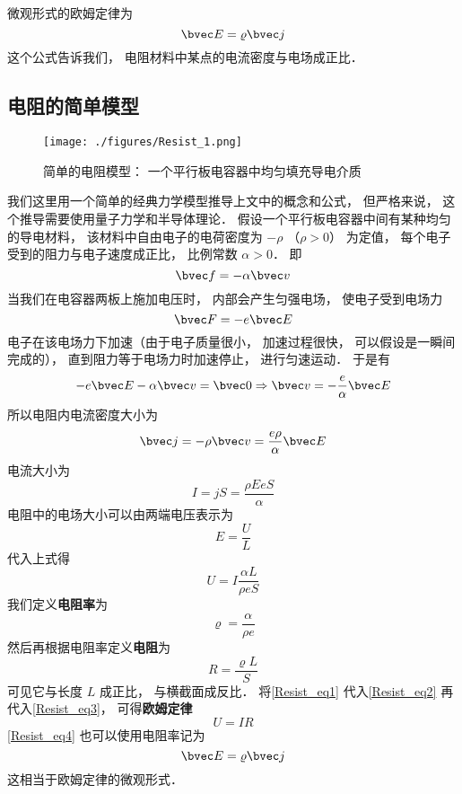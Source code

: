 微观形式的欧姆定律为
\begin{equation}
\bvec E = \varrho\bvec j
\end{equation}
这个公式告诉我们， 电阻材料中某点的电流密度与电场成正比．

\subsection{电阻的简单模型}
\begin{figure}[ht]
\centering
\texttt{[image: ./figures/Resist\_1.png]}
\caption{简单的电阻模型： 一个平行板电容器中均匀填充导电介质} \label{Resist_fig1}
\end{figure}

我们这里用一个简单的经典力学模型推导上文中的概念和公式， 但严格来说， 这个推导需要使用量子力学和半导体理论． 假设一个平行板电容器中间有某种均匀的导电材料， 该材料中自由电子的电荷密度为 $-\rho$ （$\rho > 0$） 为定值， 每个电子受到的阻力与电子速度成正比， 比例常数 $\alpha > 0$． 即
\begin{equation}
\bvec f = -\alpha \bvec v
\end{equation}
当我们在电容器两板上施加电压时， 内部会产生匀强电场， 使电子受到电场力
\begin{equation}
\bvec F = -e\bvec E
\end{equation}
电子在该电场力下加速（由于电子质量很小， 加速过程很快， 可以假设是一瞬间完成的）， 直到阻力等于电场力时加速停止， 进行匀速运动． 于是有
\begin{equation}
-e\bvec E - \alpha \bvec v = \bvec 0 \Rightarrow \bvec v = -\frac{e}{\alpha}\bvec E
\end{equation}
所以电阻内电流密度大小为
\begin{equation}\label{Resist_eq4}
\bvec j = -\rho \bvec v = \frac{e\rho}{\alpha}\bvec E
\end{equation}
电流大小为
\begin{equation}
I = jS = \frac{\rho EeS}{\alpha}
\end{equation}
电阻中的电场大小可以由两端电压表示为
\begin{equation}
E = \frac UL
\end{equation}
代入上式得
\begin{equation}\label{Resist_eq3}
U = I \frac{\alpha L}{\rho eS}
\end{equation}
我们定义\textbf{电阻率}为
\begin{equation}\label{Resist_eq1}
\varrho = \frac{\alpha}{\rho e}
\end{equation}
然后再根据电阻率定义\textbf{电阻}为
\begin{equation}\label{Resist_eq2}
R = \frac{\varrho L}{S}
\end{equation}
可见它与长度 $L$ 成正比， 与横截面成反比． 将\autoref{Resist_eq1} 代入\autoref{Resist_eq2} 再代入\autoref{Resist_eq3}， 可得\textbf{欧姆定律}
\begin{equation}
U = IR
\end{equation}
\autoref{Resist_eq4} 也可以使用电阻率记为
\begin{equation}
\bvec E = \varrho\bvec j
\end{equation}
这相当于欧姆定律的微观形式．
